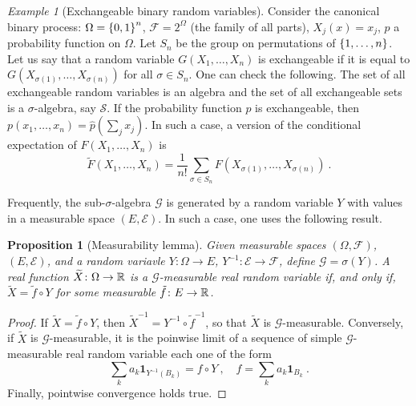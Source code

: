 \documentclass[12pt,a4paper]{amsart}
\newcommand{\one}{\bm 1}
\theoremstyle{plain}%
\newtheorem{proposition}[thm]{Proposition}
\theoremstyle{definition}
\theoremstyle{remark}
\newtheorem{example}{Example}
\begin{document}
\begin{example}[Exchangeable binary random variables] Consider the
  canonical binary process: $\Omega = \left\{0,1\right\}^n$,
  $\mathcal F = 2^\Omega$ (the family of all parts), $X_j(x) = x_j$,
$p$ a probability function on $\Omega$. Let $S_n$ be the group on
permutations of $\left\{1,\dots,n\right\}$. Let us say that a random variable
$G(X_1,\dots,X_n)$ is exchangeable if it is equal to
$G(X_{\sigma(1)},\dots,X_{\sigma(n)})$ for all $\sigma \in S_n$. One can check the following.  The set
of all exchangeable random variables is an algebra and the set of all
exchangeable sets is a $\sigma$-algebra, say $\mathcal S$. If the
probability function $p$ is exchangeable, then
$p(x_1,\dots,x_n) = \hat p(\sum_j x_j)$. In such a case, a version of
the conditional expectation of $F(X_1,\dots,X_n)$ is
\begin{equation*}
  \widetilde F(X_1,\dots,X_n) = \frac 1{n!} \sum_{\sigma \in S_n}
  F(X_{\sigma(1)},\dots,X_{\sigma(n)}) \ .  
\end{equation*}

\end{example}

\bigskip

Frequently, the sub-$\sigma$-algebra $\mathcal G$ is generated by a
random variable $Y$ with values in a measurable space $(E,\mathcal
E)$. In such a case, one uses the following result.

\begin{proposition}[Measurability lemma]
  Given measurable spaces $(\Omega,\mathcal F)$, $(E,\mathcal E)$,
  and a random variavle $Y \colon \Omega \to E$,
  $Y^{-1} \colon \mathcal E \to \mathcal F$, define
  $\mathcal G = \sigma(Y)$. A real function
  $\widetilde X \colon \Omega \to \mathbb{R}$ is a $\mathcal G$-measurable
  real random variable if, and only if,
  $\widetilde X = \tilde f \circ Y$ for some measurable
  $\tilde f \colon E \to \mathbb{R}$.
\end{proposition}

\begin{proof}
  If $\widetilde X = \tilde f \circ Y$, then
  ${\widetilde X}^{-1} = Y^{-1} \circ {\tilde f}^{-1}$, so that
  $\widetilde X$ is $\mathcal G$-measurable. Conversely, if
  $\widetilde X$ is $\mathcal G$-measurable, it is the poinwise limit
  of a sequence of simple $\mathcal G$-measurable real random variable
  each one of the form
  \begin{equation*}
    \sum_k a_k \one_{Y^{-1}(B_k)}= f \circ Y \ , \quad f = \sum_k a_k
    \one_{B_k} \ .
  \end{equation*}
  Finally, pointwise convergence holds true.
\end{proof}
\end{document}
